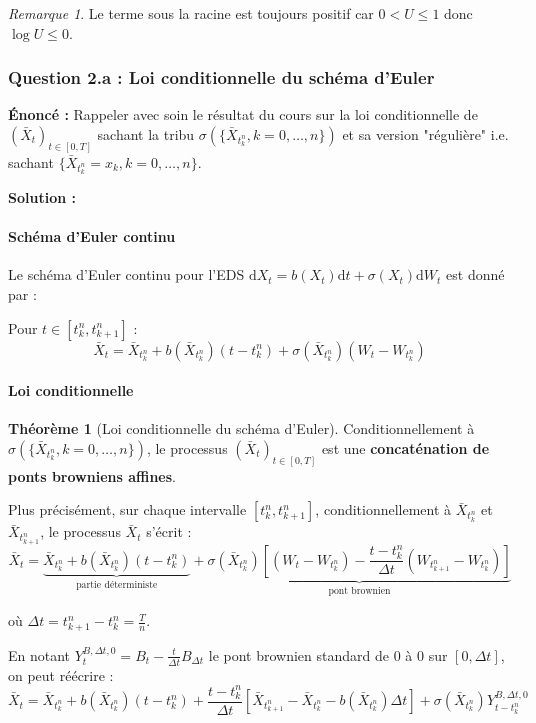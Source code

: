 \documentclass[12pt,a4paper]{article}
\theoremstyle{definition}
\newtheorem{theorem}{Théorème}[section]
\theoremstyle{remark}
\newtheorem*{remark}{Remarque}
\newcommand{\dd}{\mathrm{d}}
\begin{document}
\begin{remark}
Le terme sous la racine est toujours positif car $0 < U \leq 1$ donc $\log U \leq 0$.
\end{remark}

\subsubsection{Question 2.a : Loi conditionnelle du schéma d'Euler}

\textbf{Énoncé :} Rappeler avec soin le résultat du cours sur la loi conditionnelle de $(\bar{X}_t)_{t \in [0,T]}$ sachant la tribu $\sigma(\{\bar{X}_{t_k^n}, k=0,\ldots,n\})$ et sa version "régulière" i.e. sachant $\{\bar{X}_{t_k^n} = x_k, k=0,\ldots,n\}$.

\textbf{Solution :}

\paragraph{Schéma d'Euler continu}

Le schéma d'Euler continu pour l'EDS $\dd X_t = b(X_t)\dd t + \sigma(X_t)\dd W_t$ est donné par :

Pour $t \in [t_k^n, t_{k+1}^n]$ :
\[
\bar{X}_t = \bar{X}_{t_k^n} + b(\bar{X}_{t_k^n})(t - t_k^n) + \sigma(\bar{X}_{t_k^n})(W_t - W_{t_k^n})
\]

\paragraph{Loi conditionnelle}

\begin{theorem}[Loi conditionnelle du schéma d'Euler]
Conditionnellement à $\sigma(\{\bar{X}_{t_k^n}, k=0,\ldots,n\})$, le processus $(\bar{X}_t)_{t \in [0,T]}$ est une \textbf{concaténation de ponts browniens affines}.

Plus précisément, sur chaque intervalle $[t_k^n, t_{k+1}^n]$, conditionnellement à $\bar{X}_{t_k^n}$ et $\bar{X}_{t_{k+1}^n}$, le processus $\bar{X}_t$ s'écrit :
\[
\bar{X}_t = \underbrace{\bar{X}_{t_k^n} + b(\bar{X}_{t_k^n})(t - t_k^n)}_{\text{partie déterministe}} + \underbrace{\sigma(\bar{X}_{t_k^n})\left[(W_t - W_{t_k^n}) - \frac{t - t_k^n}{\Delta t}(W_{t_{k+1}^n} - W_{t_k^n})\right]}_{\text{pont brownien}}
\]

où $\Delta t = t_{k+1}^n - t_k^n = \frac{T}{n}$.

En notant $Y_t^{B,\Delta t, 0} = B_t - \frac{t}{\Delta t}B_{\Delta t}$ le pont brownien standard de $0$ à $0$ sur $[0,\Delta t]$, on peut réécrire :
\[
\bar{X}_t = \bar{X}_{t_k^n} + b(\bar{X}_{t_k^n})(t - t_k^n) + \frac{t - t_k^n}{\Delta t}[\bar{X}_{t_{k+1}^n} - \bar{X}_{t_k^n} - b(\bar{X}_{t_k^n})\Delta t] + \sigma(\bar{X}_{t_k^n})Y_{t-t_k^n}^{B,\Delta t, 0}
\]
\end{theorem}
\end{document}
